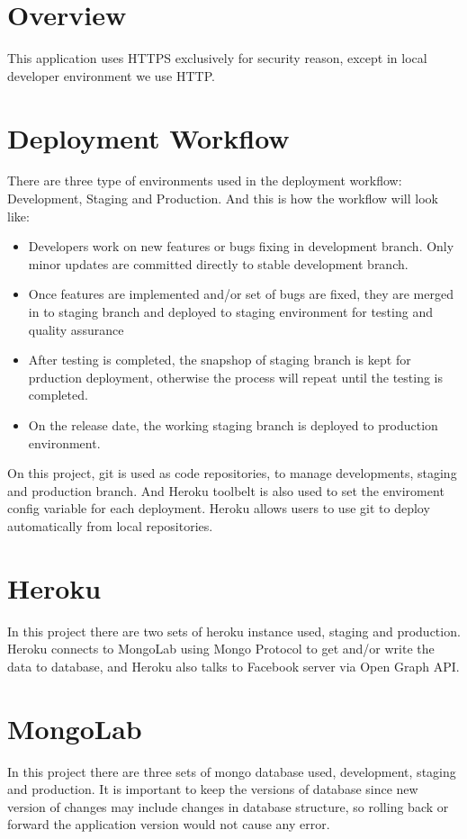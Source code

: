 
\section{Overview}
This application uses HTTPS exclusively for security reason, except in local developer environment we use HTTP. 

\section{Deployment Workflow}
There are three type of environments used in the deployment workflow: Development, Staging and Production. And this is how the workflow will look like:

\begin{itemize}
\item Developers work on new features or bugs fixing in development branch. Only minor updates are committed directly to stable development branch.
\item Once features are implemented and/or set of bugs are fixed, they are merged in to staging branch and deployed to staging environment for testing and quality assurance
\item After testing is completed, the snapshop of staging branch is kept for prduction deployment, otherwise the process will repeat until the testing is completed.
\item On the release date, the working staging branch is deployed to production environment.
\end{itemize}

On this project, git is used as code repositories, to manage developments, staging and production branch. And Heroku toolbelt is also used to set the enviroment config variable for each deployment. Heroku allows users to use git to deploy automatically from local repositories. 
 
\section{Heroku}
In this project there are two sets of heroku instance used, staging and production. 
Heroku connects to MongoLab using Mongo Protocol to get and/or write the data to database, and Heroku also talks to Facebook server via Open Graph API.

\section{MongoLab}
In this project there are three sets of mongo database used, development, staging and production. It is important to keep the versions of database since new version of changes may include changes in database structure, so rolling back or forward the application version would not cause any error. 

